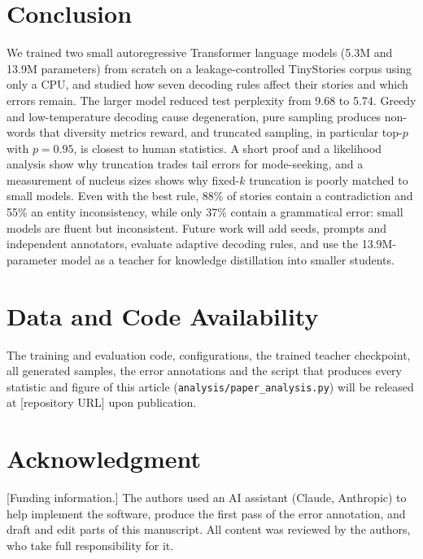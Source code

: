 \documentclass[journal]{IEEEtran}
\begin{document}
\section{Conclusion}
\label{sec:conclusion}
We trained two small autoregressive Transformer language models (5.3M and 13.9M parameters) from scratch on a leakage-controlled TinyStories corpus using only a CPU, and studied how seven decoding rules affect their stories and which errors remain. The larger model reduced test perplexity from 9.68 to 5.74. Greedy and low-temperature decoding cause degeneration, pure sampling produces non-words that diversity metrics reward, and truncated sampling, in particular top-$p$ with $p=0.95$, is closest to human statistics. A short proof and a likelihood analysis show why truncation trades tail errors for mode-seeking, and a measurement of nucleus sizes shows why fixed-$k$ truncation is poorly matched to small models. Even with the best rule, 88\% of stories contain a contradiction and 55\% an entity inconsistency, while only 37\% contain a grammatical error: small models are fluent but inconsistent. Future work will add seeds, prompts and independent annotators, evaluate adaptive decoding rules, and use the 13.9M-parameter model as a teacher for knowledge distillation \cite{hinton2015distilling} into smaller students.

\section*{Data and Code Availability}
The training and evaluation code, configurations, the trained teacher checkpoint, all generated samples, the error annotations and the script that produces every statistic and figure of this article (\texttt{analysis/paper\_analysis.py}) will be released at [repository URL] upon publication.

\section*{Acknowledgment}
[Funding information.] The authors used an AI assistant (Claude, Anthropic) to help implement the software, produce the first pass of the error annotation, and draft and edit parts of this manuscript. All content was reviewed by the authors, who take full responsibility for it.



\end{document}
